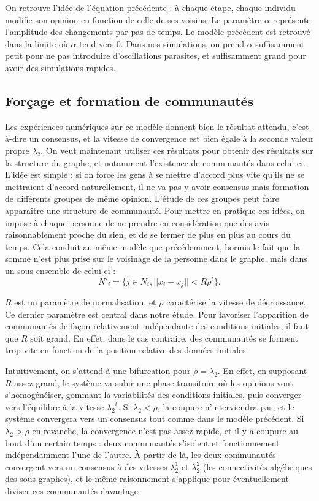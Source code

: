 \documentclass[12pt]{article}
\begin{document}
On retrouve l'idée de l'équation précédente : à chaque étape, chaque
individu modifie son opinion en fonction de celle de ses voisins. Le
paramètre $\alpha$ représente l'amplitude des changements par pas de
temps. Le modèle précédent est retrouvé dans la limite où $\alpha$
tend vers 0. Dans nos simulations, on prend $\alpha$ suffisamment
petit pour ne pas introduire d'oscillations parasites, et suffisamment
grand pour avoir des simulations rapides.

\subsection{Forçage et formation de communautés}
\label{forçage}
Les expériences numériques sur ce modèle donnent bien le résultat
attendu, c'est-à-dire un consensus, et la vitesse de convergence est
bien égale à la seconde valeur propre $\lambda_2$. On veut maintenant
utiliser ces résultats pour obtenir des résultats sur la structure du
graphe, et notamment l'existence de communautés dans celui-ci. L'idée
est simple : si on force les gens à se mettre d'accord plus vite
qu'ils ne se mettraient d'accord naturellement, il ne va pas y avoir
consensus mais formation de différents groupes de même
opinion. L'étude de ces groupes peut faire apparaître une structure de
communauté. Pour mettre en pratique ces idées, on impose à chaque
personne de ne prendre en considération que des avis raisonnablement
proche du sien, et de se fermer de plus en plus au cours du
temps. Cela conduit au même modèle que précédemment, hormis le fait que la
somme n'est plus prise sur le voisinage de la personne dans le graphe,
mais dans un sous-ensemble de celui-ci : $$N'_{i} = \{j \in N_i, ||x_i
- x_j|| < R \rho^t\}.$$

$R$ est un paramètre de normalisation, et $\rho$ caractérise la vitesse de
décroissance. Ce dernier paramètre est central dans notre étude. Pour
favoriser l'apparition de communautés de façon relativement indépendante des
conditions initiales, il faut que $R$ soit grand. En effet, dans le cas
contraire, des communautés se forment trop vite en fonction de la position
relative des données initiales.

Intuitivement, on s'attend à une bifurcation pour $\rho = \lambda_2$. En
effet, en supposant $R$ assez grand, le système va subir une phase transitoire
où les opinions vont s'homogénéiser, gommant la variabilités des conditions
initiales, puis converger vers l'équilibre à la vitesse ${\lambda_2}^t$. Si
$\lambda_2 < \rho$, la coupure n'interviendra pas, et le système convergera
vers un consensus tout comme dans le modèle précédent. Si $\lambda_2 > \rho$
en revanche, la convergence n'est pas assez rapide, et il y a coupure au bout
d'un certain temps : deux communautés s'isolent et fonctionnement
indépendamment l'une de l'autre. À partir de là, les deux communautés
convergent vers un consensus à des vitesses $\lambda_2^1$ et $\lambda_2^2$
(les connectivités algébriques des sous-graphes), et le même raisonnement
s'applique pour éventuellement diviser ces communautés davantage.
\end{document}
